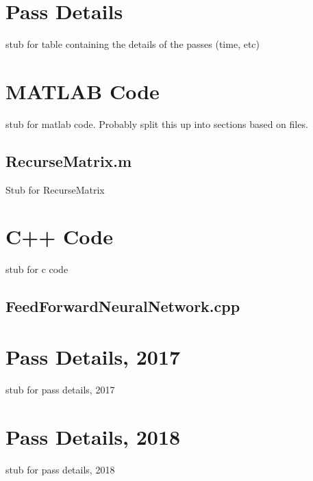 
\begin{appendices}
\chapter{Pass Details}\label{app:pass_details}
\par stub for table containing the details of the passes (time, etc)
\chapter{MATLAB Code}\label{app:MatlabCode}
\par stub for matlab code. Probably split this up into sections based on files.
\section{RecurseMatrix.m}\label{app:MatlabCode:recurseMatrix}
\par Stub for RecurseMatrix

\chapter{C++ Code} \label{app:CppCode}
\par stub for c code
\section{FeedForwardNeuralNetwork.cpp} \label{app:CppCode:ffnn}

\chapter{Pass Details, 2017}
\par stub for pass details, 2017
\chapter{Pass Details, 2018}
\par stub for pass details, 2018
\end{appendices}